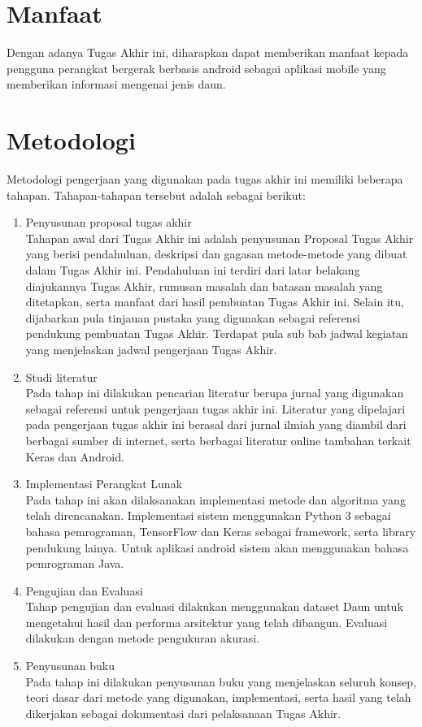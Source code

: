 \section{Manfaat}
Dengan adanya Tugas Akhir ini, diharapkan dapat memberikan manfaat kepada pengguna perangkat bergerak berbasis android sebagai aplikasi mobile yang memberikan informasi mengenai jenis daun. 

\section {Metodologi}

Metodologi pengerjaan yang digunakan pada tugas akhir ini memiliki beberapa tahapan. Tahapan-tahapan tersebut adalah sebagai berikut:

\begin{enumerate}
\item Penyusunan proposal tugas akhir\\
Tahapan awal dari Tugas Akhir ini adalah penyusunan Proposal Tugas Akhir yang berisi pendahuluan, deskripsi dan gagasan metode-metode yang dibuat dalam Tugas Akhir ini.
Pendahuluan ini terdiri dari latar belakang diajukannya Tugas Akhir, rumusan masalah dan batasan masalah yang ditetapkan, serta manfaat dari hasil pembuatan Tugas Akhir ini. Selain itu, dijabarkan pula tinjauan pustaka yang digunakan sebagai referensi pendukung pembuatan Tugas Akhir. Terdapat pula sub bab jadwal kegiatan yang menjelaskan jadwal pengerjaan Tugas Akhir.
\item Studi literatur\\
Pada tahap ini dilakukan pencarian literatur berupa jurnal yang digunakan sebagai referensi untuk pengerjaan tugas akhir ini. Literatur yang dipelajari pada pengerjaan tugas akhir ini
berasal dari jurnal ilmiah yang diambil dari berbagai sumber di internet, serta berbagai literatur online tambahan terkait Keras dan Android.
\item Implementasi Perangkat Lunak\\
Pada tahap ini akan dilaksanakan implementasi metode dan algoritma yang telah direncanakan. Implementasi sistem menggunakan Python 3 sebagai bahasa pemrograman,
TensorFlow dan Keras sebagai framework, serta library pendukung lainya. Untuk aplikasi android sistem akan menggunakan bahasa pemrograman Java.
\item Pengujian dan Evaluasi\\
Tahap pengujian dan evaluasi dilakukan menggunakan dataset Daun untuk mengetahui hasil dan performa arsitektur yang telah dibangun. Evaluasi dilakukan dengan metode pengukuran akurasi.
\item Penyusunan buku\\
Pada tahap ini dilakukan penyusunan buku yang menjelaskan seluruh konsep, teori dasar dari metode yang digunakan, implementasi, serta hasil yang telah dikerjakan sebagai dokumentasi dari pelaksanaan Tugas Akhir.
\end{enumerate}


